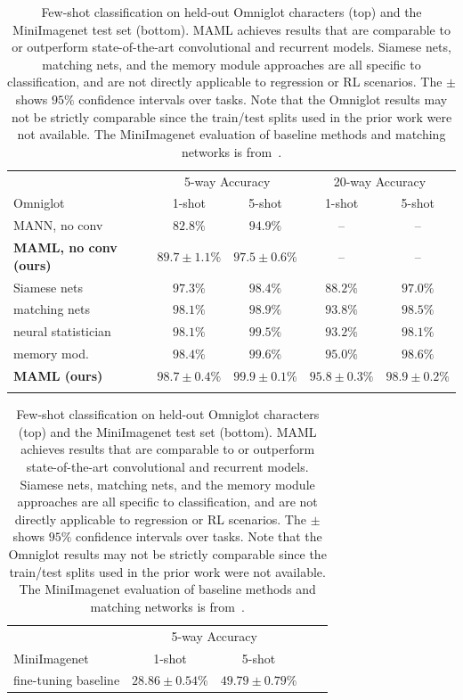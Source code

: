 \documentclass{article}
\begin{document}
\begin{table}[t]
\vspace{-0.25cm}
\caption{Few-shot classification on held-out Omniglot characters (top) and the MiniImagenet test set (bottom). MAML achieves results that are comparable to or outperform  state-of-the-art convolutional and recurrent models. Siamese nets, matching nets, and the memory module approaches are all specific to classification, and are not directly applicable to regression or RL scenarios. The $\pm$ shows $95\%$ confidence intervals over tasks. Note that the Omniglot results may not be strictly comparable since the train/test splits used in the prior work were not available. The MiniImagenet evaluation of baseline methods and matching networks is from~\citet{hugo}.}
\label{tbl:omniglot}
\begin{center}
{\footnotesize
\begin{tabular}{|l|c|c|c|c|}
\hline
\multicolumn{1}{|c}{} & \multicolumn{2}{|c|}{5-way Accuracy} & \multicolumn{2}{|c|}{20-way Accuracy}\\
{ Omniglot~\citep{omniglot}}  &  1-shot &  5-shot &  1-shot &  5-shot\\
\hline
MANN, no conv ~\cite{mann} & $82.8\%$ & $94.9\%$ &-- & -- \\
\hline
\textbf{MAML, no conv (ours)} & $\mathbf{89.7 \pm 1.1}\%$ & $\mathbf{97.5 \pm 0.6}\%$ & -- & -- \\
\hline
\hline
Siamese nets~\cite{siameseoneshot} & $97.3\%$ & $98.4\%$ & $88.2\%$ & $97.0\%$ \\
\hline
matching nets~\cite{matchingnets} & $98.1\%$ & $98.9\%$ & $93.8\%$ & $98.5\%$ \\
\hline
neural statistician~\cite{neuralstatistician} & $98.1\%$ & $99.5\%$ & $93.2\%$ & $98.1\%$ \\
\hline
memory mod.~\cite{rareevents} & $98.4\%$ & $99.6\%$ & $95.0\%$ & $98.6\%$ \\
\hline
\textbf{MAML (ours)}  & $\mathbf{98.7 \pm 0.4\%}$ & $\mathbf{99.9 \pm 0.1\%}$ & $\mathbf{95.8 \pm 0.3\%}$ & $\mathbf{98.9 \pm 0.2}\%$ \\
\hline
 \multicolumn{5}{c}{} 
\end{tabular}
\begin{tabular}{|l|c|c|c|c|}
\hline
\multicolumn{1}{|c}{} & \multicolumn{2}{|c|}{5-way Accuracy} \\
MiniImagenet~\citep{hugo}  &  1-shot &  5-shot \\
\hline
fine-tuning baseline & $28.86 \pm 0.54\%$ & $49.79 \pm 0.79\%$ \\

\end{tabular}}
\end{center}
\end{table}
\end{document}
